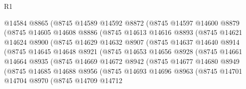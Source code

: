 \begin{lexlean}{R1}
\begin{coremodule}
                  @14584
                  @8865
                  (@8745
                    @14589
                    @14592
                    @8872
                    (@8745
                      @14597
                      @14600
                      @8879
                      (@8745
                        @14605
                        @14608
                        @8886
                        (@8745
                          @14613
                          @14616
                          @8893
                          (@8745
                            @14621
                            @14624
                            @8900
                            (@8745
                              @14629
                              @14632
                              @8907
                              (@8745
                                @14637
                                @14640
                                @8914
                                (@8745
                                  @14645
                                  @14648
                                  @8921
                                  (@8745
                                    @14653
                                    @14656
                                    @8928
                                    (@8745
                                      @14661
                                      @14664
                                      @8935
                                      (@8745
                                        @14669
                                        @14672
                                        @8942
                                        (@8745
                                          @14677
                                          @14680
                                          @8949
                                          (@8745
                                            @14685
                                            @14688
                                            @8956
                                            (@8745
                                              @14693
                                              @14696
                                              @8963
                                              (@8745
                                                @14701
                                                @14704
                                                @8970
                                                (@8745
                                                  @14709
                                                  @14712

\end{coremodule}
\end{lexlean}
